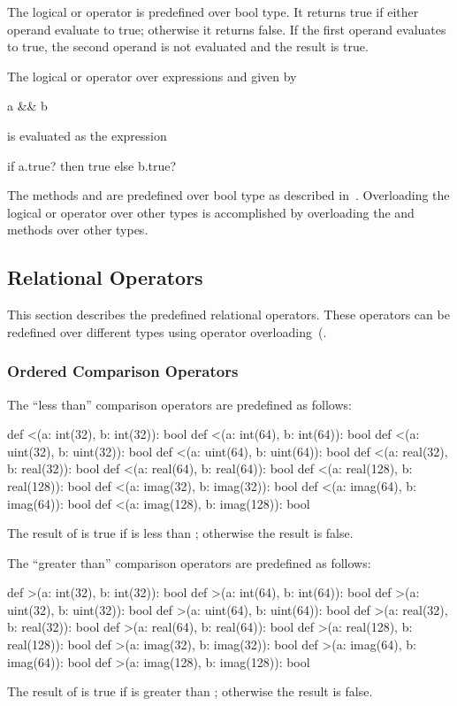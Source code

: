 The logical or operator is predefined over bool type.  It returns
true if either operand evaluate to true; otherwise it returns false.
If the first operand evaluates to true, the second operand is not
evaluated and the result is true.

The logical or operator over expressions  and  given
by
\begin{chapel}
a && b
\end{chapel}
is evaluated as the expression
\begin{chapel}
if a.true? then true else b.true?
\end{chapel}

The methods  and  are predefined over bool
type as described in~.  Overloading the
logical or operator over other types is accomplished by overloading
the  and  methods over other types.

\subsection{Relational Operators}
\label{Relational_Operators}

This section describes the predefined relational operators.  These
operators can be redefined over different types using operator
overloading~(.

\subsubsection{Ordered Comparison Operators}
\label{Ordered_Comparison_Operators}

The ``less than'' comparison operators are predefined as follows:
\begin{chapel}
def <(a: int(32), b: int(32)): bool
def <(a: int(64), b: int(64)): bool
def <(a: uint(32), b: uint(32)): bool
def <(a: uint(64), b: uint(64)): bool
def <(a: real(32), b: real(32)): bool
def <(a: real(64), b: real(64)): bool
def <(a: real(128), b: real(128)): bool
def <(a: imag(32), b: imag(32)): bool
def <(a: imag(64), b: imag(64)): bool
def <(a: imag(128), b: imag(128)): bool
\end{chapel}
The result of  is true if  is less than ;
otherwise the result is false.

The ``greater than'' comparison operators are predefined as follows:
\begin{chapel}
def >(a: int(32), b: int(32)): bool
def >(a: int(64), b: int(64)): bool
def >(a: uint(32), b: uint(32)): bool
def >(a: uint(64), b: uint(64)): bool
def >(a: real(32), b: real(32)): bool
def >(a: real(64), b: real(64)): bool
def >(a: real(128), b: real(128)): bool
def >(a: imag(32), b: imag(32)): bool
def >(a: imag(64), b: imag(64)): bool
def >(a: imag(128), b: imag(128)): bool
\end{chapel}
The result of  is true if  is greater
than ; otherwise the result is false.

